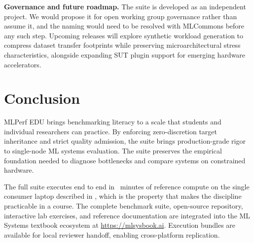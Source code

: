 \documentclass[10pt,twocolumn]{article}
\begin{document}
\textbf{Governance and future roadmap.} The suite is developed as an independent project. We would propose it for open working group governance rather than assume it, and the naming would need to be resolved with MLCommons before any such step. Upcoming releases will explore synthetic workload generation to compress dataset transfer footprints while preserving microarchitectural stress characteristics, alongside expanding SUT plugin support for emerging hardware accelerators.

\section{Conclusion}
\label{sec:conclusion}

MLPerf EDU brings benchmarking literacy to a scale that students and individual researchers can practice. By enforcing zero-discretion target inheritance and strict quality admission, the suite brings production-grade rigor to single-node ML systems evaluation. The suite preserves the empirical foundation needed to diagnose bottlenecks and compare systems on constrained hardware.

The full suite executes end to end in \ScoreReferenceTotalMinutes{}~minutes of reference compute on the single consumer laptop described in , which is the property that makes the discipline practicable in a course. The complete benchmark suite, open-source repository, interactive lab exercises, and reference documentation are integrated into the ML Systems textbook ecosystem at \url{https://mlsysbook.ai}. Execution bundles are available for local reviewer handoff, enabling cross-platform replication.

{\scriptsize
\setlength{\bibsep}{1pt plus 0.2ex}

}
\end{document}
